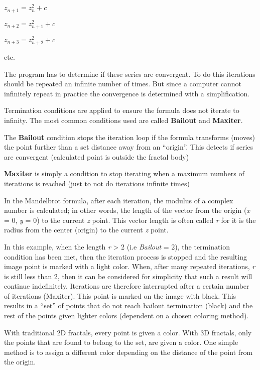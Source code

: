 \begin{center}
	\(z_{n + 1} = z_{n}^{2} + c\)
	
	\(z_{n + 2} = z_{n + 1}^{2} + c\)
	
	\(z_{n + 3} = z_{n + 2}^{2} + c\)
	
	etc.
\end{center}

The program has to determine if these series are convergent. To do this
iterations should be repeated an infinite number of times. But since a computer cannot
infinitely repeat in practice the convergence is determined with a simplification.

Termination conditions are applied to ensure the formula does not iterate to
infinity. The most common conditions used are called \textbf{Bailout} and
\textbf{Maxiter}.

\label{bailout-maxiter}The \textbf{Bailout} condition stops the iteration loop if the formula
transforms (moves) the point further than a set distance away from an
``origin''. This detects if series are convergent (calculated point is outside
the fractal body)

\textbf{Maxiter} is simply a condition to stop iterating when a maximum numbers
of iterations is reached (just to not do iterations infinite times)

In the Mandelbrot formula, after each iteration, the modulus of a complex number
is calculated; in other words, the length of the vector from the origin
(\emph{x} = 0, \emph{y} = 0) to the current \emph{z} point. This vector length
is often called \emph{r} for it is the radius from the center (origin) to the
current \emph{z} point.

In this example, when the length \emph{r} \textgreater{} 2 (i.e \emph{Bailout} =
2), the termination condition has been met, then the iteration process is
stopped and the resulting image point is marked with a light color. When, after
many repeated iterations, \emph{r} is still less than 2, then it can be
considered for simplicity that such a result will continue indefinitely.
Iterations are therefore interrupted after a certain number of iterations
(Maxiter). This point is marked on the image with black. This results in a
``set'' of points that do not reach bailout termination (black) and the rest of
the points given lighter colors (dependent on a chosen coloring method).

With traditional 2D fractals, every point is given a color. With 3D fractals,
only the points that are found to belong to the set, are given a color.
One simple method is to assign a different color depending on the distance of the point from the origin.

